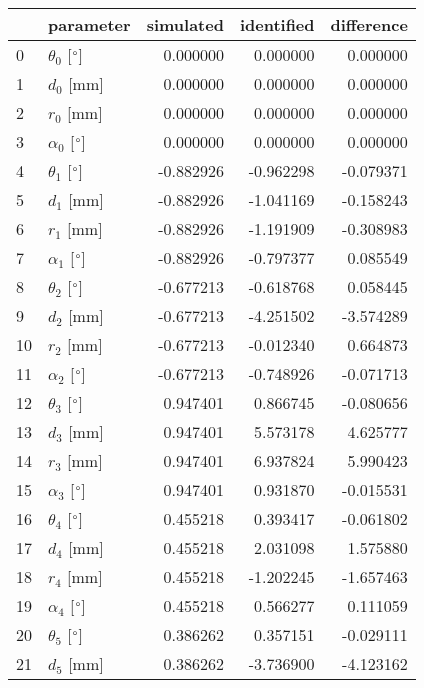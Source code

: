 \documentclass{standalone}%
\begin{document}
%
\normalsize%
\begin{tabular}{llrrr}
\toprule
{} &                 parameter & simulated & identified & difference \\
\midrule
0  &  $\theta_{0}$ [$\degree$] &  0.000000 &   0.000000 &   0.000000 \\
1  &              $d_{0}$ [mm] &  0.000000 &   0.000000 &   0.000000 \\
2  &              $r_{0}$ [mm] &  0.000000 &   0.000000 &   0.000000 \\
3  &  $\alpha_{0}$ [$\degree$] &  0.000000 &   0.000000 &   0.000000 \\
4  &  $\theta_{1}$ [$\degree$] & -0.882926 &  -0.962298 &  -0.079371 \\
5  &              $d_{1}$ [mm] & -0.882926 &  -1.041169 &  -0.158243 \\
6  &              $r_{1}$ [mm] & -0.882926 &  -1.191909 &  -0.308983 \\
7  &  $\alpha_{1}$ [$\degree$] & -0.882926 &  -0.797377 &   0.085549 \\
8  &  $\theta_{2}$ [$\degree$] & -0.677213 &  -0.618768 &   0.058445 \\
9  &              $d_{2}$ [mm] & -0.677213 &  -4.251502 &  -3.574289 \\
10 &              $r_{2}$ [mm] & -0.677213 &  -0.012340 &   0.664873 \\
11 &  $\alpha_{2}$ [$\degree$] & -0.677213 &  -0.748926 &  -0.071713 \\
12 &  $\theta_{3}$ [$\degree$] &  0.947401 &   0.866745 &  -0.080656 \\
13 &              $d_{3}$ [mm] &  0.947401 &   5.573178 &   4.625777 \\
14 &              $r_{3}$ [mm] &  0.947401 &   6.937824 &   5.990423 \\
15 &  $\alpha_{3}$ [$\degree$] &  0.947401 &   0.931870 &  -0.015531 \\
16 &  $\theta_{4}$ [$\degree$] &  0.455218 &   0.393417 &  -0.061802 \\
17 &              $d_{4}$ [mm] &  0.455218 &   2.031098 &   1.575880 \\
18 &              $r_{4}$ [mm] &  0.455218 &  -1.202245 &  -1.657463 \\
19 &  $\alpha_{4}$ [$\degree$] &  0.455218 &   0.566277 &   0.111059 \\
20 &  $\theta_{5}$ [$\degree$] &  0.386262 &   0.357151 &  -0.029111 \\
21 &              $d_{5}$ [mm] &  0.386262 &  -3.736900 &  -4.123162 \\

\end{tabular}
\end{document}
